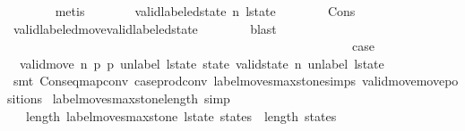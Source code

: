 \begin{isabellebody}
\ \ \ \ \ \ \isamarkupfalse%
\ metis\isanewline
\ \ \ \ \isamarkupfalse%
\ \isamarkupfalse%
\ {\isachardoublequoteopen}valid{\isacharunderscore}labeled{\isacharunderscore}state\ n\ {\isacharquery}l{\isacharunderscore}state{\isacharprime}{\isachardoublequoteclose}\isanewline
\ \ \ \ \ \ \isamarkupfalse%
\ Cons{\isacharparenleft}{}{\isacharparenright}\isanewline
\ \ \ \ \ \ \isamarkupfalse%
\ valid{\isacharunderscore}labeled{\isacharunderscore}move{\isacharunderscore}valid{\isacharunderscore}labeled{\isacharunderscore}state\isanewline
\ \ \ \ \ \ \isamarkupfalse%
\ blast\isanewline
\ \ \isamarkupfalse%
\ \ \ \ \ \ \ \ \ \ \ \ \ \ \ \ \ \ \ \ \ \ \ \ \ \ \ \ \ \ \ \ \ \ \ \ \ \ \ \ \ \ \ \ \ \ \ \ \ \isanewline
\ \ \isamarkupfalse%
\ \isamarkupfalse%
\ {\isacharquery}case\isanewline
\ \ \ \ \isamarkupfalse%
\ {\isacharasterisk}\ {\isacartoucheopen}valid{\isacharunderscore}move{\isacharprime}\ n\ {\isacharquery}p{}\ {\isacharquery}p{}\ {\isacharparenleft}unlabel\ l{\isacharunderscore}state{\isacharparenright}\ state{\isacharprime}{\isacartoucheclose}\ {\isacartoucheopen}valid{\isacharunderscore}state\ n\ {\isacharparenleft}unlabel\ l{\isacharunderscore}state{\isacharparenright}{\isacartoucheclose}\ \isanewline
\ \ \ \ \isamarkupfalse%
\ {\isacharparenleft}smt\ Cons{\isacharunderscore}eq{\isacharunderscore}map{\isacharunderscore}conv\ case{\isacharunderscore}prod{\isacharunderscore}conv\ label{\isacharunderscore}moves{\isacharunderscore}max{\isacharunderscore}stone{\isachardot}simps{\isacharparenleft}{}{\isacharparenright}\ valid{\isacharunderscore}move{\isacharprime}{\isacharunderscore}move{\isacharunderscore}positions{\isacharparenright}\isanewline
{}\isamarkupfalse%
%
\endisatagproof
{\isafoldproof}%
%
\isadelimproof
\isanewline
%
\endisadelimproof
\isanewline
{}\isamarkupfalse%
\ label{\isacharunderscore}moves{\isacharunderscore}max{\isacharunderscore}stone{\isacharunderscore}length\ {\isacharbrackleft}simp{\isacharbrackright}{\isacharcolon}\isanewline
\ \ \ {\isachardoublequoteopen}length\ {\isacharparenleft}label{\isacharunderscore}moves{\isacharunderscore}max{\isacharunderscore}stone\ l{\isacharunderscore}state\ states{\isacharparenright}\ {\isacharequal}\ length\ states\ {\isacharplus}\ {}{\isachardoublequoteclose}\isanewline
%
\isadelimproof
\ \ %
\endisadelimproof

\end{isabellebody}
